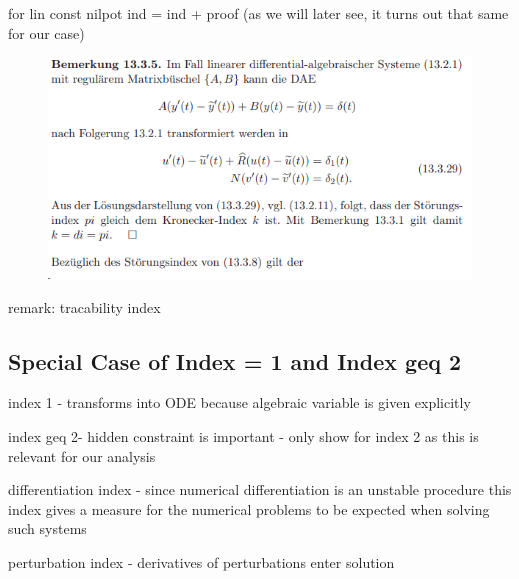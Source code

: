 for lin const nilpot ind  = ind + proof (as we will later see, it turns out that same for our case)


\begin{figure}[H]
	\centering
	\includegraphics[width=0.7\linewidth]{screenshot005}
	\caption{}
	\label{fig:screenshot005}
\end{figure}


remark: tracability index


\subsection{Special Case of Index = 1 and Index geq 2}

	index 1 - transforms into ODE because algebraic variable is given explicitly
	
	index geq 2- hidden constraint is important - only show for index 2 as this is relevant for our analysis
	


	
	differentiation index - since numerical differentiation is an unstable procedure this index gives a measure for the numerical problems to be expected when solving such systems
	
	perturbation index - derivatives of perturbations enter solution
	
	
	
